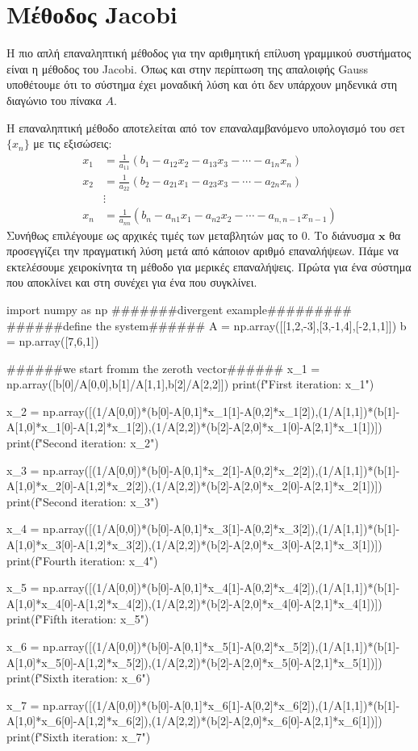 \chapter{Μέθοδος {\en Jacobi}}
Η πιο απλή επαναληπτική μέθοδος για την αριθμητική επίλυση γραμμικού συστήματος είναι η μέθοδος του {\en Jacobi}. Όπως και στην περίπτωση της απαλοιφής {\en Gauss} υποθέτουμε ότι το σύστημα έχει μοναδική λύση και ότι δεν υπάρχουν μηδενικά στη διαγώνιο του πίνακα $A$.

Η επαναληπτική μέθοδο αποτελείται από τον επαναλαμβανόμενο υπολογισμό του σετ $\{x_n \}$ με τις εξισώσεις:
\begin{equation}
\begin{aligned}
x_1 &=\frac{1}{a_{11}}\left(b_1-a_{12} x_2-a_{13} x_3-\cdots-a_{1 n} x_n\right) \\
x_2 &=\frac{1}{a_{22}}\left(b_2-a_{21} x_1-a_{23} x_3-\cdots-a_{2 n} x_n\right) \\
& \vdots \\
x_n &=\frac{1}{a_{n n}}\left(b_n-a_{n 1} x_1-a_{n 2} x_2-\cdots-a_{n, n-1} x_{n-1}\right)
\end{aligned}
\end{equation}
Συνήθως επιλέγουμε ως αρχικές τιμές των μεταβλητών μας το $0$. Το διάνυσμα $\mathbf{x}$ θα προσεγγίζει την πραγματική λύση μετά από κάποιον αριθμό επαναλήψεων. Πάμε να εκτελέσουμε χειροκίνητα τη μέθοδο για μερικές επαναλήψεις. Πρώτα για ένα σύστημα που αποκλίνει και στη συνέχει για ένα που συγκλίνει. 
\en
\begin{python}
import numpy as np
#######divergent example#########
######define the system######
A = np.array([[1,2,-3],[3,-1,4],[-2,1,1]])
b = np.array([7,6,1])

######we start fromm the zeroth vector######
x_1 = np.array([b[0]/A[0,0],b[1]/A[1,1],b[2]/A[2,2]])
print(f"First iteration: {x_1}")

x_2 = np.array([(1/A[0,0])*(b[0]-A[0,1]*x_1[1]-A[0,2]*x_1[2]),(1/A[1,1])*(b[1]-A[1,0]*x_1[0]-A[1,2]*x_1[2]),(1/A[2,2])*(b[2]-A[2,0]*x_1[0]-A[2,1]*x_1[1])])
print(f"Second iteration: {x_2}")

x_3 = np.array([(1/A[0,0])*(b[0]-A[0,1]*x_2[1]-A[0,2]*x_2[2]),(1/A[1,1])*(b[1]-A[1,0]*x_2[0]-A[1,2]*x_2[2]),(1/A[2,2])*(b[2]-A[2,0]*x_2[0]-A[2,1]*x_2[1])])
print(f"Second iteration: {x_3}")

x_4 = np.array([(1/A[0,0])*(b[0]-A[0,1]*x_3[1]-A[0,2]*x_3[2]),(1/A[1,1])*(b[1]-A[1,0]*x_3[0]-A[1,2]*x_3[2]),(1/A[2,2])*(b[2]-A[2,0]*x_3[0]-A[2,1]*x_3[1])])
print(f"Fourth iteration: {x_4}")

x_5 = np.array([(1/A[0,0])*(b[0]-A[0,1]*x_4[1]-A[0,2]*x_4[2]),(1/A[1,1])*(b[1]-A[1,0]*x_4[0]-A[1,2]*x_4[2]),(1/A[2,2])*(b[2]-A[2,0]*x_4[0]-A[2,1]*x_4[1])])
print(f"Fifth iteration: {x_5}")

x_6 = np.array([(1/A[0,0])*(b[0]-A[0,1]*x_5[1]-A[0,2]*x_5[2]),(1/A[1,1])*(b[1]-A[1,0]*x_5[0]-A[1,2]*x_5[2]),(1/A[2,2])*(b[2]-A[2,0]*x_5[0]-A[2,1]*x_5[1])])
print(f"Sixth iteration: {x_6}")

x_7 = np.array([(1/A[0,0])*(b[0]-A[0,1]*x_6[1]-A[0,2]*x_6[2]),(1/A[1,1])*(b[1]-A[1,0]*x_6[0]-A[1,2]*x_6[2]),(1/A[2,2])*(b[2]-A[2,0]*x_6[0]-A[2,1]*x_6[1])])
print(f"Sixth iteration: {x_7}")
\end{python}
